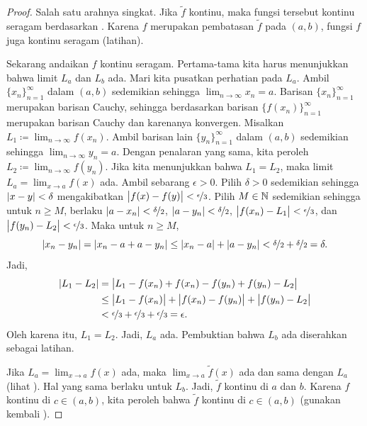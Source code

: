 \begin{proof}
Salah satu arahnya singkat.  Jika $\widetilde{f}$ kontinu, maka
fungsi tersebut kontinu seragam berdasarkan .  Karena $f$ merupakan
pembatasan $\widetilde{f}$ pada $(a,b)$, fungsi $f$ juga kontinu seragam
(latihan).

Sekarang andaikan $f$ kontinu seragam.  Pertama-tama kita harus menunjukkan
bahwa limit $L_a$ dan $L_b$ ada.  Mari kita pusatkan perhatian pada $L_a$.
Ambil $\{ x_n \}_{n=1}^\infty$ dalam $(a,b)$ sedemikian sehingga
$\lim_{n\to\infty} x_n = a$.
Barisan $\{ x_n \}_{n=1}^\infty$ merupakan barisan Cauchy, sehingga berdasarkan
barisan $\bigl\{ f(x_n) \bigr\}_{n=1}^\infty$ merupakan barisan Cauchy dan karenanya konvergen.
Misalkan $L_1 \coloneqq \lim_{n\to\infty} f(x_n)$.  Ambil barisan lain
$\{ y_n \}_{n=1}^\infty$ dalam $(a,b)$ sedemikian sehingga $\lim_{n\to\infty} y_n = a$.
Dengan penalaran yang sama,
kita peroleh $L_2 \coloneqq \lim_{n\to\infty} f(y_n)$.  Jika kita menunjukkan bahwa $L_1 = L_2$, maka
limit $L_a = \lim_{x\to a} f(x)$ ada.  Ambil sebarang $\epsilon > 0$.
Pilih $\delta > 0$ sedemikian sehingga $\lvert {x-y} \rvert < \delta$ mengakibatkan $\bigl\lvert {f(x)-f(y)} \bigr\rvert <
\nicefrac{\epsilon}{3}$.  Pilih $M \in {\mathbb{N}}$ sedemikian sehingga untuk
$n \geq M$, berlaku $\lvert {a-x_n} \rvert < \nicefrac{\delta}{2}$,
$\lvert {a-y_n} \rvert < \nicefrac{\delta}{2}$,
$\bigl\lvert {f(x_n)-L_1} \bigr\rvert < \nicefrac{\epsilon}{3}$, dan
$\bigl\lvert {f(y_n)-L_2} \bigr\rvert < \nicefrac{\epsilon}{3}$.  Maka untuk $n \geq M$,
\begin{equation*}
\lvert {x_n-y_n} \rvert = 
\lvert {x_n-a+a-y_n} \rvert \leq
\lvert {x_n-a} \rvert+\lvert {a-y_n} \rvert < \nicefrac{\delta}{2} + \nicefrac{\delta}{2} =
\delta.
\end{equation*}
Jadi,
\begin{equation*}
\begin{split}
\lvert {L_1-L_2} \rvert &=
\bigl\lvert {L_1-f(x_n)+f(x_n)-f(y_n)+f(y_n)-L_2} \bigr\rvert \\
& \leq 
\bigl\lvert {L_1-f(x_n)} \bigr\rvert+\bigl\lvert {f(x_n)-f(y_n)} \bigr\rvert+\bigl\lvert {f(y_n)-L_2} \bigr\rvert \\
& <
\nicefrac{\epsilon}{3} + \nicefrac{\epsilon}{3} + \nicefrac{\epsilon}{3}
=
\epsilon .
\end{split}
\end{equation*}
Oleh karena itu, $L_1 = L_2$.
Jadi, $L_a$ ada.  Pembuktian bahwa $L_b$ ada diserahkan sebagai latihan.

Jika $L_a = \lim_{x\to a} f(x)$
ada, maka $\lim_{x\to a} \widetilde{f}(x)$ ada
dan sama dengan $L_a$
(lihat ).  Hal yang sama berlaku untuk $L_b$.
Jadi, $\widetilde{f}$ kontinu di $a$ dan $b$.
Karena $f$ kontinu di $c \in (a,b)$,
kita peroleh bahwa
$\widetilde{f}$ kontinu di $c \in (a,b)$ (gunakan kembali ).
\end{proof}


